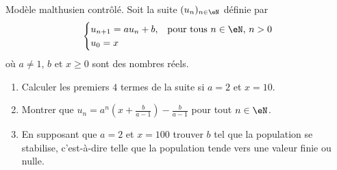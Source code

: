 
\begin{exercice}\label{exoTD3-0005}

	Modèle malthusien contrôlé. Soit la suite $(u_n)_{n\in\eN}$ définie par
	\begin{equation}\nonumber
		\begin{cases}
			u_{n+1}=au_n+b,	&	\textrm{pour tous } n\in\eN, \, n>0\\
			u_0=x
		\end{cases}
	\end{equation}
	où $a\neq 1$, $b$ et $x\geq 0$ sont des nombres réels.
	\begin{enumerate}
        \item Calculer les premiers $4$ termes de la suite si $a=2$ et $x=10$.
		\item
			Montrer que $u_n=a^n(x+\frac{ b }{ a-1 })-\frac{ b }{ a-1 }$ pour tout $n\in\eN$.
		\item
			En supposant que $a=2$ et $x=100$ trouver $b$ tel que la population se stabilise, c'est-à-dire telle que la population tende vers une valeur finie ou nulle.
	\end{enumerate}

\end{exercice}
